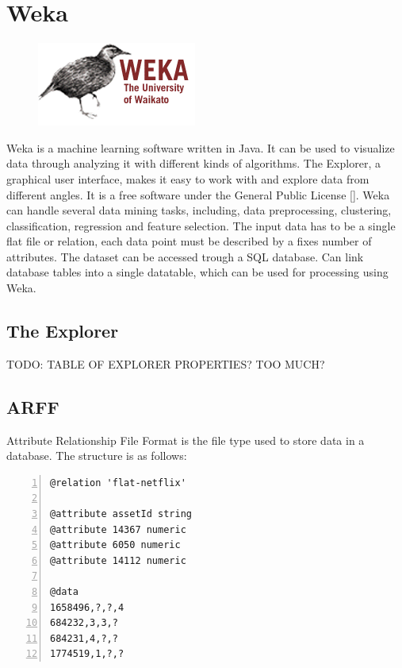 \section{Weka}

\begin{figure}
\vspace{-30pt}
\centering
\includegraphics[width = .25\textwidth]{image/Weka-logo.png}
\end{figure}


Weka is a machine learning software written in Java. It can be used to visualize data through analyzing it with different kinds of algorithms. The Explorer, a graphical user interface, makes it easy to work with and explore data from different angles. It is a free software under the General Public License [].
Weka can handle several data mining tasks, including, data preprocessing, clustering, classification, regression and feature selection. The input data has to be a single flat file or relation, each data point must be described by a fixes number of attributes. The dataset can be accessed trough a SQL database. Can link database tables into a single datatable, which can be used for processing using Weka.

\subsection{The Explorer}
TODO: TABLE OF EXPLORER PROPERTIES? TOO MUCH?

\subsection{ARFF}
Attribute Relationship File Format is the file type used to store data in a database. The structure is as follows:

\begin{lstlisting}[caption={ARFF Example},captionpos=b,label={lst:arffEx},numbers=left]
@relation 'flat-netflix'

@attribute assetId string
@attribute 14367 numeric
@attribute 6050 numeric
@attribute 14112 numeric

@data
1658496,?,?,4
684232,3,3,?
684231,4,?,?
1774519,1,?,?
\end{lstlisting}

